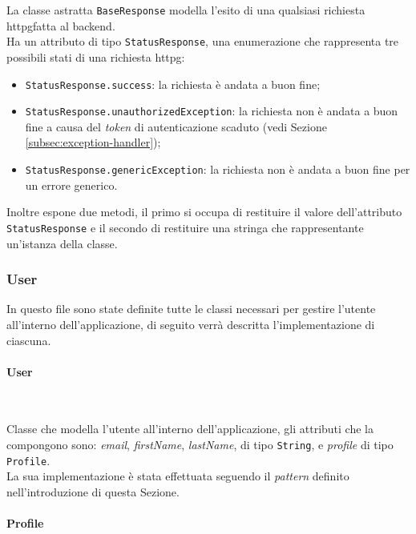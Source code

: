 La classe astratta \lstinline{BaseResponse} modella l'esito di una qualsiasi richiesta \gls{httpg}\glsoccur fatta al \gls{backend}\glsoccur. \\
Ha un attributo di tipo \lstinline{StatusResponse}, una enumerazione che rappresenta tre possibili stati di una richiesta \gls{httpg}\glsoccur:
\begin{itemize}
    \item \lstinline{StatusResponse.success}: la richiesta è andata a buon fine;
    \item \lstinline{StatusResponse.unauthorizedException}: la richiesta non è andata a buon fine a causa del \emph{token} di autenticazione scaduto (vedi Sezione \ref{subsec:exception-handler});
    \item \lstinline{StatusResponse.genericException}: la richiesta non è andata a buon fine per un errore generico.
\end{itemize}
Inoltre espone due metodi, il primo si occupa di restituire il valore dell'attributo \lstinline{StatusResponse} e il secondo di restituire una stringa che rappresentante un'istanza della classe.

\subsubsection*{User}
\label{subsubsec:user}

In questo file sono state definite tutte le classi necessari per gestire l'utente all'interno dell'applicazione, di seguito verrà descritta l'implementazione di ciascuna.

\paragraph*{User} ~ \\
\label{par:user}

\noindent Classe che modella l'utente all'interno dell'applicazione, gli attributi che la compongono sono: \emph{email}, \emph{firstName}, \emph{lastName}, di tipo \lstinline{String}, e \emph{profile} di tipo \lstinline{Profile}. \\
La sua implementazione è stata effettuata seguendo il \emph{pattern} definito nell'introduzione di questa Sezione.

\paragraph*{Profile} ~ \\
\label{par:profile}

